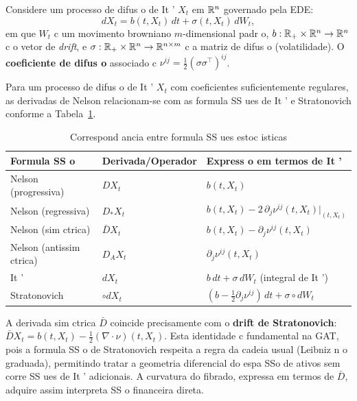 Considere um processo de difus o de It ' $X_t$ em $\mathbb{R}^n$ governado pela EDE:
\begin{equation}
 dX_t = b(t,X_t)\,dt + \sigma(t,X_t)\,dW_t,
\end{equation}
em que $W_t$ c um movimento browniano $m$-dimensional padr o, $b:\mathbb{R}_+\times\mathbb{R}^n\to\mathbb{R}^n$ c o vetor de \textit{drift}, e $\sigma:\mathbb{R}_+\times\mathbb{R}^n\to\mathbb{R}^{n\times m}$ c a matriz de difus o (volatilidade). O \textbf{coeficiente de difus o} associado c $\nu^{ij} = \frac{1}{2}(\sigma\sigma^\top)^{ij}$.

\begin{teo}
Para um processo de difus o de It ' $X_t$ com coeficientes suficientemente regulares, as derivadas de Nelson relacionam-se com as formula SS ues de It ' e Stratonovich conforme a Tabela~\ref{tab:nelson_ito_strat}.
\end{teo}

\begin{table}[htbp]
\centering
\caption{Correspond ancia entre formula SS ues estoc isticas}
\label{tab:nelson_ito_strat}
\renewcommand{\arraystretch}{1.4}
\begin{tabular}{@{}p{3.2cm}p{5cm}p{5cm}@{}}
\toprule
\textbf{Formula SS o} & \textbf{Derivada/Operador} & \textbf{Express o em termos de It '} \\
\midrule
Nelson (progressiva) & $DX_t$ & $b(t,X_t)$ \\
Nelson (regressiva) & $D_*X_t$ & $b(t,X_t) - 2\,\partial_j\nu^{ij}(t,X_t)\big|_{(t,X_t)}$ \\
Nelson (sim ctrica) & $\bar{D}X_t$& $b(t,X_t) - \partial_j\nu^{ij}(t,X_t)$ \\
Nelson (antissim ctrica)& $D_A X_t$ & $\partial_j\nu^{ij}(t,X_t)$ \\
It ' & $dX_t$ & $b\,dt + \sigma\,dW_t$ (integral de It ') \\
Stratonovich & $\circ dX_t$& $(b - \frac{1}{2}\partial_j\nu^{ij})\,dt + \sigma\circ dW_t$ \\
\bottomrule
\end{tabular}
\end{table}

\begin{obs}
A derivada sim ctrica $\bar{D}$ coincide precisamente com o \textbf{drift de Stratonovich}: $\bar{D}X_t = b(t,X_t) - \frac{1}{2}(\nabla\cdot\nu)(t,X_t)$. Esta identidade c fundamental na GAT, pois a formula SS o de Stratonovich respeita a regra da cadeia usual (Leibniz n o graduada), permitindo tratar a geometria diferencial do espa SSo de ativos sem corre SS ues de It ' adicionais. A curvatura do fibrado, expressa em termos de $\bar{D}$, adquire assim interpreta SS o financeira direta.
\end{obs}

